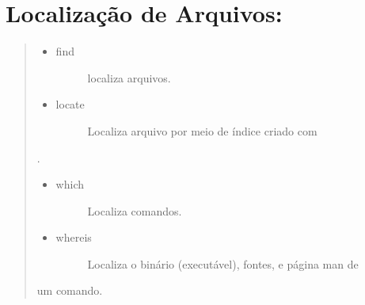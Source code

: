 \documentclass[a4paper,10pt,brazil]{sphinxmanual}
\begin{document}
\section{Localização de Arquivos:}
\label{unix:localizacao-de-arquivos}\begin{quote}
\begin{itemize}
\item {} \begin{description}
\item[{find}] \leavevmode
localiza arquivos.

\end{description}

\item {} \begin{description}
\item[{locate}] \leavevmode
Localiza arquivo por meio de índice criado com

\end{description}

\end{itemize}

.
\begin{itemize}
\item {} \begin{description}
\item[{which}] \leavevmode
Localiza comandos.

\end{description}

\item {} \begin{description}
\item[{whereis}] \leavevmode
Localiza o binário (executável), fontes, e página man de

\end{description}

\end{itemize}

um comando.
\end{quote}
\end{document}
